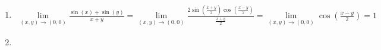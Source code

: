 \begin{enumerate}
		\item 
			\begin{gather*}
				\lim\limits_{(x,y) \to (0,0)}\frac{\sin(x) + \sin(y)}{x + y} = 
				\lim\limits_{(x,y) \to (0,0)} \frac{2\sin(\frac{x + y}{2}) \cos(\frac{x - y}{2})}{\frac{x + y}{2}} = 
				\lim\limits_{(x,y) \to (0,0)}\cos(\frac{x - y}{2}) = 1	
			\end{gather*}
		
		\item 
			\begin{gather*}	
			\end{gather*}
		\end{enumerate}
		

		\subsection{}
